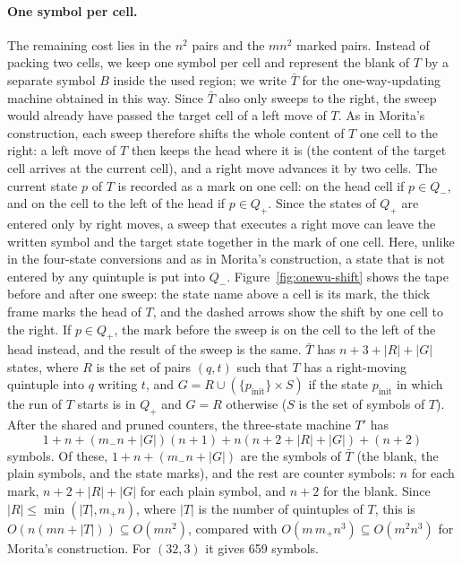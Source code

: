 \documentclass{article}
\theoremstyle{definition}
\theoremstyle{remark}
\begin{document}
\paragraph{One symbol per cell.}
The remaining cost lies in the $n^2$ pairs and the $mn^2$ marked pairs.
Instead of packing two cells, we keep one symbol per cell and represent the blank of $T$ by a separate symbol $B$ inside the used region; we write $\bar T$ for the one-way-updating machine obtained in this way.
Since $\bar T$ also only sweeps to the right, the sweep would already have passed the target cell of a left move of $T$. As in Morita's construction, each sweep therefore shifts the whole content of $T$ one cell to the right: a left move of $T$ then keeps the head where it is (the content of the target cell arrives at the current cell), and a right move advances it by two cells.
The current state $p$ of $T$ is recorded as a mark on one cell: on the head cell if $p\in Q_-$, and on the cell to the left of the head if $p\in Q_+$. Since the states of $Q_+$ are entered only by right moves, a sweep that executes a right move can leave the written symbol and the target state together in the mark of one cell. Here, unlike in the four-state conversions and as in Morita's construction, a state that is not entered by any quintuple is put into $Q_-$.
Figure~\ref{fig:onewu-shift} shows the tape before and after one sweep: the state name above a cell is its mark, the thick frame marks the head of $T$, and the dashed arrows show the shift by one cell to the right. If $p\in Q_+$, the mark before the sweep is on the cell to the left of the head instead, and the result of the sweep is the same.
$\bar T$ has $n+3+|R|+|G|$ states, where $R$ is the set of pairs $(q,t)$ such that $T$ has a right-moving quintuple into $q$ writing $t$, and $G=R\cup(\{p_{\mathrm{init}}\}\times S)$ if the state $p_{\mathrm{init}}$ in which the run of $T$ starts is in $Q_+$ and $G=R$ otherwise ($S$ is the set of symbols of $T$).
After the shared and pruned counters, the three-state machine $T'$ has
\[
  1+n+(m_-n+|G|)(n+1)+n(n+2+|R|+|G|)+(n+2)
\]
symbols. Of these, $1+n+(m_-n+|G|)$ are the symbols of $\bar T$ (the blank, the plain symbols, and the state marks), and the rest are counter symbols: $n$ for each mark, $n+2+|R|+|G|$ for each plain symbol, and $n+2$ for the blank.
Since $|R|\le\min(|T|,m_+n)$, where $|T|$ is the number of quintuples of $T$, this is $O(n(mn+|T|))\subseteq O(mn^2)$, compared with $O(m\,m_+n^3)\subseteq O(m^2n^3)$ for Morita's construction.
For $(32,3)$ it gives 659 symbols.
\end{document}
